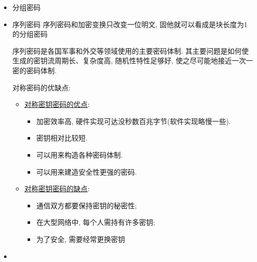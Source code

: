 \documentclass[UTF8]{ctexart}
\begin{document}
    \begin{itemize}
        \item 分组密码
        \item 序列密码
            序列密码和加密变换只改变一位明文, 固他就可以看成是块长度为1的分组密码

            序列密码是各国军事和外交等领域使用的主要密码体制. 其主要问题是如何使生成的密钥流周期长、复杂度高, 随机性特性足够好, 使之尽可能地接近一次一密的密码体制.

            对称密码的优缺点:
            \begin{itemize}
                \item \underline{对称密钥密码的优点}:
                \begin{itemize}
                    \item 加密效率高, 硬件实现可达没秒数百兆字节(软件实现略慢一些).
                    \item 密钥相对比较短.
                    \item 可以用来构造各种密码体制.
                    \item 可以用来建造安全性更强的密码.
                \end{itemize}
                \item \underline{对称密钥密码的缺点}:
                \begin{itemize}
                    \item 通信双方都要保持密钥的秘密性;
                    \item 在大型网络中, 每个人需持有许多密钥;
                    \item 为了安全, 需要经常更换密钥
                \end{itemize}
            \end{itemize}
            \item
        \end{itemize}
\end{document}
